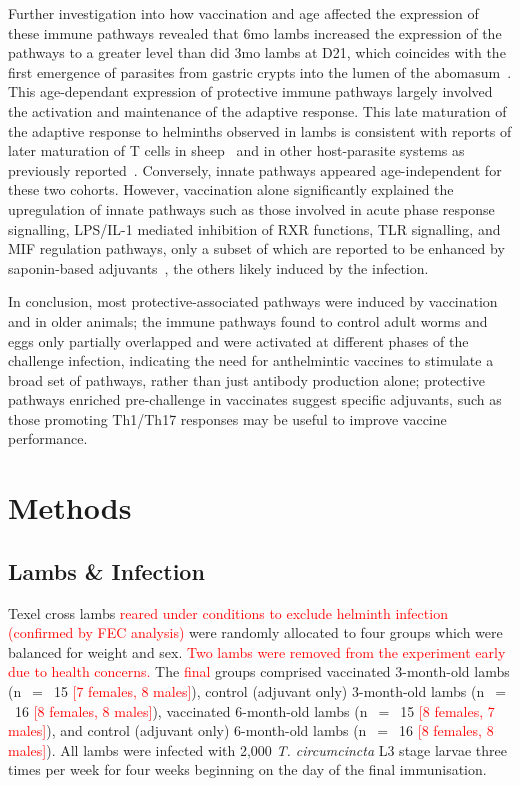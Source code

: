 \documentclass[a4paper, hidelinks, 11pt]{article}
\begin{document}
Further investigation into how vaccination and age affected the expression of
these immune pathways revealed that 6mo lambs increased the expression of the
pathways to a greater level than did 3mo lambs at D21, which coincides with the
first emergence of parasites from gastric crypts into the lumen of the
abomasum~\supercite{Denham1969,McNeilly2017}. This age-dependant expression of
protective immune pathways largely involved the activation and maintenance of
the adaptive response. This late maturation of the adaptive response to
helminths observed in lambs is consistent with reports of later maturation of T
cells in sheep~\supercite{Outteridge1985,Colditz1996} and in other host-parasite
systems as previously reported~\supercite{Babayan2018b}. Conversely, innate pathways
appeared age-independent for these two cohorts. However, vaccination alone
significantly explained the upregulation of innate pathways such as those
involved in acute phase response signalling, LPS/IL-1 mediated inhibition of
RXR functions, TLR signalling, and MIF regulation pathways, only a subset of
which are reported to be enhanced by saponin-based
adjuvants~\supercite{Ho2018,Marty-Roix2016}, the others likely induced by the
infection.

In conclusion, most protective-associated pathways were induced by vaccination
and in older animals; the immune pathways found to control adult worms and eggs
only partially overlapped and were activated at different phases of the
challenge infection, indicating the need for anthelmintic vaccines to stimulate
a broad set of pathways, rather than just antibody production alone; protective
pathways enriched pre-challenge in vaccinates suggest specific adjuvants, such
as those promoting Th1/Th17 responses may be useful to improve vaccine
performance.


\begingroup
\sffamily
\small
\baselineskip24pt

\section{Methods }

\subsection{Lambs \& Infection}

Texel cross lambs \textcolor{red}{reared under conditions to exclude helminth
infection (confirmed by FEC analysis)} were randomly allocated to four groups
which were balanced for weight and sex. \textcolor{red}{Two lambs were removed
from the experiment early due to health concerns.} The \textcolor{red}{final}
groups comprised vaccinated 3-month-old lambs (n~\(=\)~15 \textcolor{red}{[7
females, 8 males]}), control (adjuvant only) 3-month-old lambs (n~\(=\)~16
\textcolor{red}{[8 females, 8 males]}), vaccinated 6-month-old lambs (n~\(=\)~15
\textcolor{red}{[8 females, 7 males]}), and control (adjuvant only) 6-month-old
lambs (n~\(=\)~16 \textcolor{red}{[8 females, 8 males]}). All lambs were
infected with 2,000 \emph{T. circumcincta} L3 stage larvae three times per week
for four weeks beginning on the day of the final immunisation.
\end{document}
